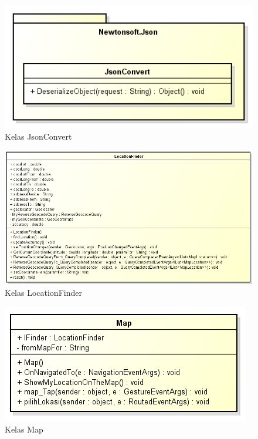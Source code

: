 \begin{figure}[h!]
	\centering
		\includegraphics[scale=0.6]{Gambar/useCase_dan_Class/perClass/jsonConvert}
	\caption{Kelas JsonConvert}
	\label{fig:kelasJsonConvert}
\end{figure}

\begin{figure}[h!]
	\centering
		\includegraphics[scale=0.6]{Gambar/useCase_dan_Class/perClass/locationFinder}
	\caption{Kelas LocationFinder}
	\label{fig:kelaslLocationFinder}
\end{figure}

\begin{figure}[h!]
	\centering
		\includegraphics[scale=0.6]{Gambar/useCase_dan_Class/perClass/map}
	\caption{Kelas Map}
	\label{fig:kelaslMap}
\end{figure}

